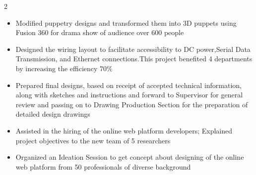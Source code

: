 \documentclass[10pt,a4paper,ragged2e,withhyper]{altacv}
\begin{document}
\begin{paracol}{2}


\divider
\begin{itemize}
\item Modified puppetry designs and transformed them into 3D puppets using Fusion 360 for drama show of audience over 600 people
\end{itemize}
\divider
{}
 \begin{itemize}
\item Designed the wiring layout to facilitate accessibility to DC power,Serial Data Transmission, and Ethernet connections.This project benefited 4 departments by increasing the efficiency 70\%
\item Prepared final designs, based on receipt of accepted  technical information, along with sketches and instructions and forward to Supervisor for general review and passing on to Drawing Production Section for the preparation of detailed design drawings
 \end{itemize}
\divider


\begin{itemize}
\item Assisted in the hiring of the online web platform developers; Explained project objectives to the new team of 5 researchers
\item Organized an Ideation Session to get concept about designing of the online web platform from 50 professionals of diverse background
\end{itemize}
\divider




\end{paracol}
\end{document}
